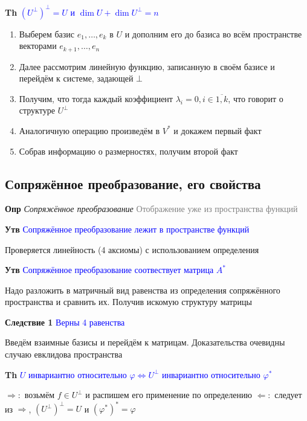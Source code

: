 \documentclass[a4paper, 14pt]{article}
\begin{document}
    
    \textbf{Th} \textcolor{blue}{$(U^\bot)^\bot = U$ и $\dim U + \dim U^\bot = n$}
    
    \begin{enumerate}
        \item Выберем базис $e_1, \dots, e_k$ в $U$ и дополним его до базиса во всём пространстве векторами $e_{k+1},
        \dots, e_n$
        \item Далее рассмотрим линейную функцию, записанную в своём базисе и перейдём к системе, задающей $\bot$
        \item Получим, что тогда каждый коэффициент $\lambda_i = 0, i \in \overline{1, k}$, что говорит о структуре $
        U^\bot$
        \item Аналогичную операцию произведём в $V^*$ и докажем первый факт
        \item Собрав информацию о размерностях, получим второй факт
    \end{enumerate}
    
    \subsection{Сопряжённое преобразование, его свойства}
    
    \textbf{Опр} \textit{Сопряжённое преобразование} \textcolor{gray}{Отображение уже из пространства функций}
    
    \textbf{Утв} \textcolor{blue}{Сопряжённое преобразование лежит в пространстве функций}
    
    Проверяется линейность (4 аксиомы) с использованием определения
    
    \textbf{Утв} \textcolor{blue}{Сопряжённое преобразование соотвествует матрица $A^*$}
    
    Надо разложить в матричный вид равенства из определения сопряжённого пространства и сравнить их.
    Получив искомую структуру матрицы
    
    \textbf{Следствие 1} \textcolor{blue}{Верны 4 равенства}
    
    Введём взаимные базисы и перейдём к матрицам.
    Доказательства очевидны случаю евклидова пространства
    
    \textbf{Th} \textcolor{blue}{$U$ инвариантно относительно $\varphi \Leftrightarrow U^\bot$ инвариантно относительно $\varphi^*$}
    
    $\Rightarrow:$ возьмём $f \in U^\bot$ и распишем его применение по определению
    $\Leftarrow:$ следует из $\Rightarrow$, $(U^\bot)^\bot = U$ и $(\varphi^*)^* = \varphi$
    
\end{document}
